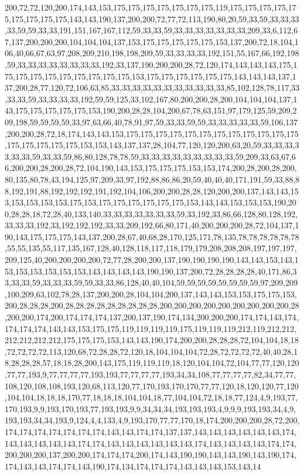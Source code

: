 200,72,72,120,200,174,143,153,175,175,175,175,175,175,175,119,175,175,175,175,175,175,175,175,175,143,143,190,137,200,200,72,77,72,113,190,80,20,59,33,59,33,33,33,33,59,59,33,33,191,151,167,167,112,59,33,33,59,33,33,33,33,33,33,33,209,33,6,112,67,137,200,200,200,104,104,104,137,153,175,175,175,175,175,153,137,200,72,18,104,106,40,66,67,63,97,208,209,210,198,198,209,59,33,33,33,33,192,151,55,167,66,192,198,59,33,33,33,33,33,33,33,33,192,33,137,190,200,200,28,72,120,174,143,143,143,175,175,175,175,175,175,175,175,175,175,153,175,175,175,175,175,175,143,143,143,137,137,200,28,77,120,72,106,63,85,33,33,33,33,33,33,33,33,33,33,33,85,102,128,78,117,33,33,33,59,33,33,33,33,192,59,59,125,33,102,167,80,200,200,28,200,104,104,104,137,143,175,175,175,175,175,153,190,200,28,28,104,200,67,78,63,151,97,179,125,59,209,209,198,59,59,59,59,33,97,63,66,40,78,91,97,59,33,33,59,59,33,33,33,33,33,59,106,137,200,200,28,72,18,174,143,143,153,175,175,175,175,175,175,175,175,175,175,175,175,175,175,175,175,175,153,153,143,137,137,28,104,77,120,120,200,63,20,59,33,33,33,33,33,33,59,33,33,59,86,80,128,78,78,59,33,33,33,33,33,33,33,33,33,59,209,33,63,67,66,200,200,28,200,28,72,104,190,143,153,175,175,175,153,153,174,200,28,200,28,200,80,135,80,78,43,194,125,97,209,33,97,192,88,86,86,20,59,40,40,40,171,191,59,33,88,88,192,191,88,192,192,192,191,192,104,106,200,200,28,28,120,200,200,137,143,143,153,153,153,153,153,175,153,175,175,175,175,175,175,153,143,143,153,153,153,190,200,28,28,18,72,28,40,133,140,33,33,33,33,33,33,33,59,33,192,33,86,66,128,80,128,192,33,33,33,192,33,192,192,192,33,33,209,192,66,80,171,40,200,200,200,28,72,104,137,190,143,175,175,175,143,137,200,28,67,40,68,28,170,125,171,78,135,78,78,78,78,78,78,55,55,135,55,117,135,167,128,40,128,118,117,118,179,179,208,208,208,197,197,197,209,125,40,200,200,200,200,72,77,28,200,200,137,190,190,190,190,143,143,153,143,153,153,153,153,153,153,143,143,143,143,190,190,137,200,72,28,28,28,28,40,171,86,33,33,33,59,33,33,33,59,59,33,33,86,128,40,40,104,59,59,59,59,59,59,59,59,97,209,209,100,209,63,102,78,28,137,200,200,28,104,104,200,137,143,143,153,153,175,175,153,200,28,28,28,200,28,28,28,28,28,28,28,28,28,200,200,200,200,200,200,200,200,200,28,200,200,174,200,174,174,174,137,200,137,190,174,134,200,200,200,174,174,143,174,174,174,174,143,143,153,175,175,119,119,119,119,175,119,119,119,212,119,212,212,212,212,212,212,175,175,175,153,143,143,190,174,200,200,28,28,28,72,104,104,18,18,72,72,72,72,113,120,68,72,28,28,72,120,18,104,104,104,72,28,72,72,72,72,40,40,28,18,28,28,28,57,18,18,28,200,143,175,119,119,119,18,120,104,104,72,104,77,77,120,120,77,77,193,9,77,77,77,77,193,193,77,77,77,77,193,34,34,108,77,77,77,77,82,34,77,77,108,120,108,108,193,120,68,113,120,77,170,193,170,170,77,77,120,18,120,120,77,120,104,104,18,18,18,170,77,18,18,18,104,104,18,77,104,104,72,18,18,77,124,4,9,193,77,170,193,9,9,193,170,193,77,193,193,9,9,34,34,34,193,193,193,4,9,9,9,193,193,34,4,9,193,193,34,34,193,9,124,4,4,133,4,9,193,170,77,77,170,18,174,200,200,200,28,72,200,174,174,174,174,174,174,174,143,143,174,174,137,137,143,143,143,143,143,143,174,143,143,143,143,143,174,174,143,143,143,143,143,143,174,143,143,143,143,174,174,200,200,200,137,200,200,174,174,174,200,174,143,190,190,143,143,190,143,190,174,174,143,143,174,174,143,190,174,134,174,174,174,143,143,143,153,143,14